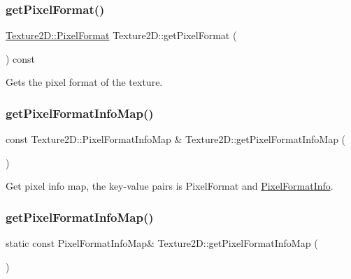 \subsubsection{\texorpdfstring{get\+Pixel\+Format()}{getPixelFormat()}\hspace{0.1cm}{\footnotesize\ttfamily [2/2]}}
{\footnotesize\ttfamily \hyperlink{classTexture2D_a45d9d8bb5a0669def36bbdfbfb91d220}{Texture2\+D\+::\+Pixel\+Format} Texture2\+D\+::get\+Pixel\+Format (\begin{DoxyParamCaption}{ }\end{DoxyParamCaption}) const}

Gets the pixel format of the texture. \mbox{\label{classTexture2D_a2c619bc5157360bd84af422b68397328}} 
\subsubsection{\texorpdfstring{get\+Pixel\+Format\+Info\+Map()}{getPixelFormatInfoMap()}\hspace{0.1cm}{\footnotesize\ttfamily [1/2]}}
{\footnotesize\ttfamily const Texture2\+D\+::\+Pixel\+Format\+Info\+Map \& Texture2\+D\+::get\+Pixel\+Format\+Info\+Map (\begin{DoxyParamCaption}{ }\end{DoxyParamCaption})\hspace{0.3cm}{\ttfamily [static]}}

Get pixel info map, the key-\/value pairs is Pixel\+Format and \hyperlink{structTexture2D_1_1PixelFormatInfo}{Pixel\+Format\+Info}. \mbox{\label{classTexture2D_abe771002b23ab001b927696754828b1f}} 
\subsubsection{\texorpdfstring{get\+Pixel\+Format\+Info\+Map()}{getPixelFormatInfoMap()}\hspace{0.1cm}{\footnotesize\ttfamily [2/2]}}
{\footnotesize\ttfamily static const Pixel\+Format\+Info\+Map\& Texture2\+D\+::get\+Pixel\+Format\+Info\+Map (\begin{DoxyParamCaption}{ }\end{DoxyParamCaption})\hspace{0.3cm}{\ttfamily [static]}}

